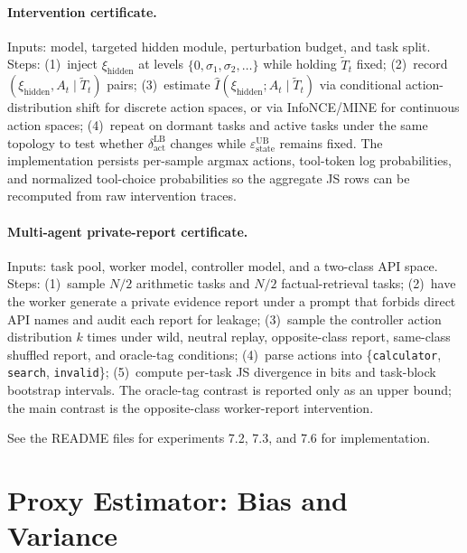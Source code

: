 \documentclass{article}
\begin{document}
  \paragraph{Intervention certificate.} Inputs: model, targeted hidden module,
  perturbation budget, and task split. Steps: (1)~inject $\xi_\text{hidden}$ at
  levels $\{0, \sigma_1, \sigma_2, \ldots\}$ while holding $\tilde T_t$ fixed;
  (2)~record $(\xi_\text{hidden}, A_t \mid \tilde T_t)$ pairs; (3)~estimate
  $\hat I(\xi_\text{hidden}; A_t \mid \tilde T_t)$ via conditional
  action-distribution shift for discrete action spaces, or via InfoNCE/MINE for
  continuous action spaces; (4)~repeat on dormant tasks and active tasks under
  the same topology to test whether $\delta_\text{act}^\text{LB}$ changes while
  $\varepsilon_\text{state}^\text{UB}$ remains fixed. The implementation
  persists per-sample argmax actions, tool-token log probabilities, and
  normalized tool-choice probabilities so the aggregate JS rows can be
  recomputed from raw intervention traces.

  \paragraph{Multi-agent private-report certificate.} Inputs: task pool, worker
  model, controller model, and a two-class API space. Steps: (1)~sample $N/2$
  arithmetic tasks and $N/2$ factual-retrieval tasks; (2)~have the worker
  generate a private evidence report under a prompt that forbids direct API
  names and audit each report for leakage; (3)~sample the controller action
  distribution $k$ times under wild, neutral replay, opposite-class report,
  same-class shuffled report, and oracle-tag conditions; (4)~parse actions into
  \{\texttt{calculator}, \texttt{search}, \texttt{invalid}\}; (5)~compute
  per-task JS divergence in bits and task-block bootstrap intervals. The
  oracle-tag contrast is reported only as an upper bound; the main contrast is
  the opposite-class worker-report intervention.

  See the README files for experiments 7.2, 7.3, and 7.6 for implementation.

  \section{Proxy Estimator: Bias and Variance}
  \label{app:proxy-bias}
\end{document}
